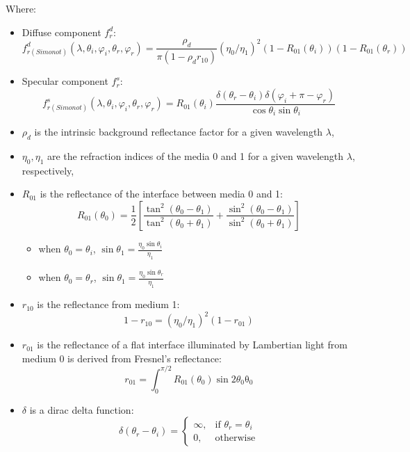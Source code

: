 Where:
\begin{itemize}
    \item Diffuse component $f_r^{d}$:
          \[
              f_{r(Simonot)}^{d}(\lambda, \theta_i, \varphi_i, \theta_r, \varphi_r) = \frac{\rho_d}{\pi (1 - \rho_d r_{10})}%
              (\eta_0 / \eta_1)^2 %
              (1 - R_{01}(\theta_i)) %
              (1-R_{01}(\theta_r))%
          \]
    \item Specular component $f_r^{s}$:
          \[
              f_{r(Simonot)}^{s}(\lambda, \theta_i, \varphi_i, \theta_r, \varphi_r) = R_{01}(\theta_i)%
              \frac{\delta(\theta_r - \theta_i) \delta (\varphi_i + \pi - \varphi_r)}%
              {\cos\theta_i \sin\theta_i}
          \]

    \item $\rho_d$ is the intrinsic background reflectance factor for a given wavelength $\lambda$,

    \item $\eta_0, \eta_1$ are the refraction indices of the media 0 and 1 for a given wavelength $\lambda$, respectively,

    \item $R_{01}$ is the reflectance of the interface between media 0 and 1:
          \[
              R_{01}(\theta_0) = \frac{1}{2}%
              \left[
                  \frac{\tan^2(\theta_0 - \theta_1)}{\tan^2(\theta_0 + \theta_1)}%
                  + \frac{\sin^2(\theta_0 - \theta_1)}{\sin^2(\theta_0 + \theta_1)}%
                  \right]
          \]
          \begin{itemize}
              \item when $\theta_0 = \theta_i$, $\sin\theta_1 = \frac{\eta_0 \sin\theta_i}{\eta_1}$
              \item when $\theta_0 = \theta_r$, $\sin\theta_1 = \frac{\eta_0 \sin\theta_r}{\eta_1}$
          \end{itemize}

    \item $r_{10}$ is the reflectance from medium 1:
          \[
              1 - r_{10} = (\eta_0/\eta_1)^2 (1-r_{01})
          \]

    \item $r_{01}$ is the reflectance of a flat interface illuminated by Lambertian light from medium 0 is derived from Fresnel's reflectance:
          \[
              r_{01} = \int_{0}^{\pi/2} R_{01}(\theta_0) \sin2\theta_0 \mathrm{\theta_0}
          \]

    \item $\delta$ is a dirac delta function:
          \[
              \delta(\theta_r - \theta_i) = \begin{cases}
                  \infty, & \mbox{if $\theta_r = \theta_i$} \\
                  0,      & \mbox{otherwise}
              \end{cases}
          \]
\end{itemize}

